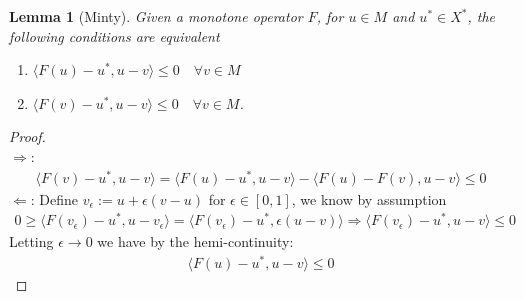 \documentclass[a4paper,11pt,oneside,fleqn]{book}
\newtheorem{lemma}[theorem]{Lemma}
\theoremstyle{definition}
\theoremstyle{remark}
\begin{document}
\begin{lemma}[Minty]
	Given a monotone operator $F$, for $u \in M$ and $u^* \in X^*$, the following conditions are equivalent
	\begin{enumerate}
		\item $ \langle F(u) - u^*, u - v \rangle \le 0 \quad \forall v \in M$
		\item $\langle F(v) - u^*, u - v \rangle \le 0 \quad \forall v \in  M$.  
	\end{enumerate}
\end{lemma}
\begin{proof}
	\quad\\
	$\Rightarrow$: 
	\begin{align*}
		\langle F(v) - u^*, u - v \rangle = 
		\langle F(u) - u^*, u - v \rangle - \langle F(u) - F(v), u - v \rangle \le 0
	\end{align*}
	$\Leftarrow$: Define $v_\epsilon:= u + \epsilon( v - u)$ for $\epsilon \in [0, 1]$,  we know by assumption
	\begin{align*}
	 	0 \ge \langle F(v_\epsilon) - u^*, u - v_\epsilon \rangle = \langle F(v_\epsilon) - u^*, \epsilon (u - v) \rangle 
	 	\Rightarrow \langle F(v_\epsilon) -  u^*, u - v\rangle \le 0
	\end{align*}
	Letting $\epsilon \rightarrow 0$ we have by the hemi-continuity:
	\begin{align*}
		\langle F(u) - u^*, u - v \rangle \le 0
	\end{align*}
\end{proof}
\end{document}
